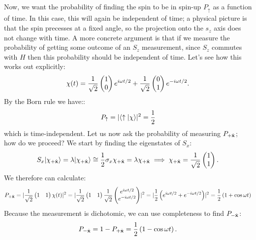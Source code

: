 Now, we want the probability of finding the spin to be in spin-up $P_\uparrow$ as a function of time. In this case, this will again be independent of time; a physical picture is that the spin precesses at a fixed angle, so the projection onto the $s_z$ axis does not change with time. A more concrete argument is that if we measure the probability of getting some outcome of an $S_z$ measurement, since $S_z$ commutes with $H$ then this probability should be independent of time. Let's see how this works out explicitly:
\begin{equation}
    \chi(t) = \frac{1}{\sqrt{2}}\begin{pmatrix}1\\0\end{pmatrix}e^{i\omega t/2} + \frac{1}{\sqrt{2}}\begin{pmatrix}0\\1\end{pmatrix}e^{-i\omega t/2}.
\end{equation}
By the Born rule we have::
\begin{equation}
    P_\uparrow = \lvert \langle \uparrow \lvert \chi \rangle \rvert^2 = \frac{1}{2}
\end{equation}
which is time-independent. Let us now ask the probability of measuring $P_{+\hat{\mathbf{x}}}$; how do we proceed? We start by finding the eigenstates of $S_x$:
\begin{equation}
    S_x \lvert \chi_{+\hat{\mathbf{x}}} \rangle = \lambda \lvert \chi_{+\hat{\mathbf{x}}} \rangle \cong \frac{1}{2}\sigma_x\chi_{+\hat{\mathbf{x}}} = \lambda \chi_{+\hat{\mathbf{x}}} \implies \chi_{+\hat{\mathbf{x}}} = \frac{1}{\sqrt{2}}\begin{pmatrix}1\\1\end{pmatrix}.
\end{equation}
We therefore can calculate:
\begin{equation}
    P_{+\hat{\mathbf{x}}} = \lvert \frac{1}{\sqrt{2}}\begin{pmatrix}1 & 1\end{pmatrix}\chi(t) \rvert^2 = \lvert \frac{1}{\sqrt{2}}\begin{pmatrix}1 & 1\end{pmatrix}\frac{1}{\sqrt{2}}\begin{pmatrix}e^{i\omega t/2} \\ e^{-i\omega t/2}\end{pmatrix} \rvert^2 = \lvert \frac{1}{2}\left(e^{i\omega t/2} + e^{-i\omega t/2}\right) \rvert^2 = \frac{1}{2}\left(1 + \cos\omega t\right)
\end{equation}
Because the measurement is dichotomic, we can use completeness to find $P_{-\hat{\mathbf{x}}}$:
\begin{equation}
    P_{-\hat{\mathbf{x}}} = 1 - P_{+\hat{\mathbf{x}}} = \frac{1}{2}\left(1 - \cos\omega t\right).
\end{equation}